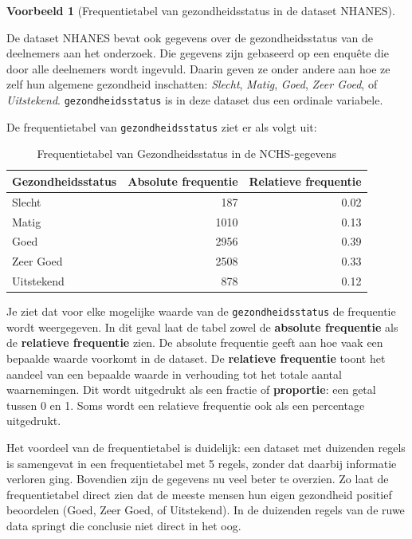 \documentclass[
  a4paper,
]{scrbook}
\theoremstyle{definition}
\theoremstyle{definition}
\newtheorem{example}{Voorbeeld}[chapter]
\theoremstyle{remark}
\begin{document}
\begin{example}[Frequentietabel van gezondheidsstatus in de dataset
NHANES]\protect\hypertarget{exm-freq-gezondheidsstatus}{}\label{exm-freq-gezondheidsstatus}

De dataset NHANES bevat ook gegevens over de gezondheidsstatus van de
deelnemers aan het onderzoek. Die gegevens zijn gebaseerd op een enquête
die door alle deelnemers wordt ingevuld. Daarin geven ze onder andere
aan hoe ze zelf hun algemene gezondheid inschatten: \emph{Slecht},
\emph{Matig}, \emph{Goed}, \emph{Zeer Goed}, of \emph{Uitstekend}.
\texttt{gezondheidsstatus} is in deze dataset dus een ordinale
variabele.

De frequentietabel van \texttt{gezondheidsstatus} ziet er als volgt uit:

\begin{longtable}[]{@{}lrr@{}}

\caption{\label{tbl-gezondheid}Frequentietabel van Gezondheidsstatus in
de NCHS-gegevens}

\tabularnewline

\toprule\noalign{}
Gezondheidsstatus & Absolute frequentie & Relatieve frequentie \\
\midrule\noalign{}
\endhead
\bottomrule\noalign{}
\endlastfoot
Slecht & 187 & 0.02 \\
Matig & 1010 & 0.13 \\
Goed & 2956 & 0.39 \\
Zeer Goed & 2508 & 0.33 \\
Uitstekend & 878 & 0.12 \\

\end{longtable}

\end{example}

Je ziet dat voor elke mogelijke waarde van de \texttt{gezondheidsstatus}
de frequentie wordt weergegeven. In dit geval laat de tabel zowel de
\textbf{absolute frequentie} als de \textbf{relatieve frequentie} zien.
De absolute frequentie geeft aan hoe vaak een bepaalde waarde voorkomt
in de dataset. De \textbf{relatieve frequentie} toont het aandeel van
een bepaalde waarde in verhouding tot het totale aantal waarnemingen.
Dit wordt uitgedrukt als een fractie of \textbf{proportie}: een getal
tussen 0 en 1. Soms wordt een relatieve frequentie ook als een
percentage uitgedrukt.

Het voordeel van de frequentietabel is duidelijk: een dataset met
duizenden regels is samengevat in een frequentietabel met 5 regels,
zonder dat daarbij informatie verloren ging. Bovendien zijn de gegevens
nu veel beter te overzien. Zo laat de frequentietabel direct zien dat de
meeste mensen hun eigen gezondheid positief beoordelen (Goed, Zeer Goed,
of Uitstekend). In de duizenden regels van de ruwe data springt die
conclusie niet direct in het oog.
\end{document}
